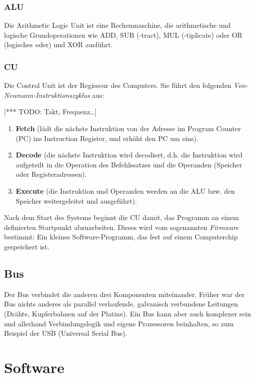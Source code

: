 \subsubsection{ALU}

Die Arithmetic Logic Unit ist eine Rechenmaschine, die arithmetische und logische Grundoperationen wie ADD, SUB (-tract), MUL (-tiplicate) oder OR (logisches oder) und XOR ausführt.

\subsubsection{CU}

Die Control Unit ist der Regisseur des Computers. Sie führt den folgenden \emph{Von-Neumann-Instruktionszyklus} aus:

[*** TODO: Takt, Frequenz…] 
\begin{enumerate}
	\item \textbf{Fetch} (lädt die nächste Instruktion von der Adresse im Program Counter (PC) ins Instruction Register, und erhöht den PC um eins).
	\item \textbf{Decode} (die nächste Instruktion wird decodiert, d.h. die Instruktion wird aufgeteilt in die Operation des Befehlssatzes und die Operanden (Speicher oder Registeradressen).
	\item \textbf{Execute} (die Instruktion und Operanden werden an die ALU bzw. den Speicher weitergeleitet und ausgeführt).
\end{enumerate}

Nach dem Start des Systems beginnt die CU damit, das Programm an einem definierten Startpunkt abzuarbeiten. Dieses wird vom sogenannten \emph{Firmware} bestimmt: Ein kleines Software-Programm, das fest auf einem Computerchip gespeichert ist.

\subsection{Bus}

Der Bus verbindet die anderen drei Komponenten miteinander. Früher war der Bus nichts anderes als parallel verlaufende, galvanisch verbundene Leitungen (Drähte, Kupferbahnen auf der Platine). Ein Bus kann aber auch komplexer sein und allerhand Verbindungslogik und eigene Prozessoren beinhalten, so zum Beispiel der USB (Universal Serial Bus). 

\section{Software}

